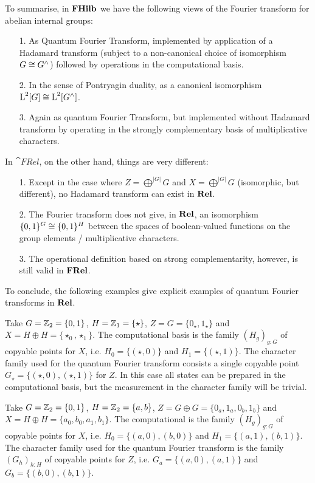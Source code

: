 To summarise, in $\mathbf{FHilb}$ we have the following views of the Fourier transform for abelian internal groups:
\begin{enumerate}
\item[1.] As Quantum Fourier Transform, implemented by application of a Hadamard transform (subject to a non-canonical choice of isomorphism $G \cong G^\wedge$) followed by operations in the computational basis.
\item[2.] In the sense of Pontryagin duality, as a canonical isomorphism $\operatorname{L}^2[G] \cong \operatorname{L}^2[G^\wedge]$.
\item[3.] Again as quantum Fourier Transform, but implemented without Hadamard transform by operating in the strongly complementary basis of multiplicative characters.
\end{enumerate}

In $\cat{FRel}$, on the other hand, things are very different:
\begin{enumerate}
\item[1.] Except in the case where $Z = \bigoplus^{|G|}G$ and $X = \bigoplus^{|G|}G$ (isomorphic, but different), no Hadamard transform can exist in $\mathbf{Rel}$.
\item[2.] The Fourier transform does not give, in $\mathbf{Rel}$, an isomorphism $\{0,1\}^G \cong \{0,1\}^H$ between the spaces of boolean-valued functions on the group elements / multiplicative characters.
\item[3.] The operational definition based on strong complementarity, however, is still valid in $\mathbf{FRel}$. 
\end{enumerate}

To conclude, the following examples give explicit examples of quantum Fourier transforms in $\mathbf{Rel}$.

\begin{example}
Take $G=\mathbb{Z}_{2}=\{0,1\}$, $H=\mathbb{Z}_{1}=\{\star\}$, $Z = G = \{ 0_\star,1_\star \}$ and $X=H\oplus H = \{ \star_0,\star_1 \}$. The computational basis is the family $(H_g)_{g:G}$ of copyable points for $X$, i.e. $H_0 = \{(\star,0)\}$ and $H_1 = \{(\star,1)\}$. The character family used for the quantum Fourier transform consists a single copyable point $G_\star = \{(\star,0), (\star,1)\}$ for $Z$. In this case all states can be prepared in the computational basis, but the measurement in the character family will be trivial.
\end{example}

\begin{example}
Take $G=\mathbb{Z}_{2}=\{0,1\}$, $H=\mathbb{Z}_{2}=\{a,b\}$, $Z = G \oplus G = \{ 0_a,1_a,0_b,1_b\}$ and $X= H \oplus H = \{ a_0, b_0, a_1, b_1 \}$. The computational  is the family $(H_g)_{g:G}$ of copyable points for $X$, i.e. $H_0 = \{(a,0),(b,0)\}$ and $H_1 = \{(a,1),(b,1)\}$. The character family used for the quantum Fourier transform is the family $(G_h)_{h:H}$ of copyable points for $Z$, i.e. $G_a = \{(a,0),(a,1)\}$ and $G_b = \{(b,0),(b,1)\}$.
\end{example}

